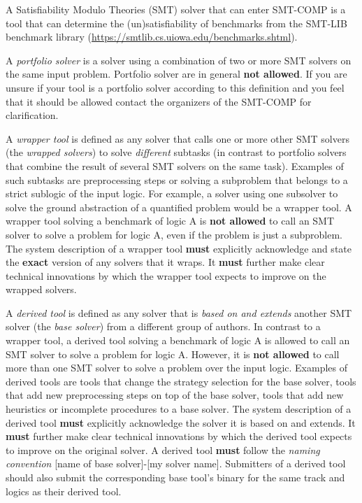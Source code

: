 \documentclass[12pt]{article}
\begin{document}
%
A Satisfiability Modulo Theories (SMT) solver that can enter SMT-COMP is a tool that can determine the
(un)satisfia\-bility of benchmarks from the SMT-LIB benchmark library
(\url{https://smtlib.cs.uiowa.edu/benchmarks.shtml}).

%
A \emph{portfolio solver} is a solver using a combination of two or
more SMT solvers on the same input problem. Portfolio solver are in
general \textbf{not allowed}. If you are unsure if your tool is a portfolio
solver according to this definition and you feel that it should be allowed
contact the organizers of the SMT-COMP for clarification.

%
A \emph{wrapper tool} is defined as any solver that calls one or more other SMT
solvers (the \emph{wrapped solvers}) to solve \emph{different} subtasks
(in contrast to portfolio solvers that combine the result of several SMT
solvers on the same task).
Examples of such subtasks are preprocessing steps or solving a subproblem that
belongs to a strict sublogic of the input logic.
For example, a solver using one subsolver to solve the ground abstraction of a
quantified problem would be a wrapper tool.
A wrapper tool solving a benchmark of logic A
is \textbf{not allowed} to call an SMT solver to solve a problem for logic A,
even if the problem is just a subproblem.
The system description of a wrapper tool \textbf{must}
explicitly acknowledge and state the \textbf{exact} version of any solvers that
it wraps.  It \textbf{must} further make clear technical innovations by which
the wrapper tool expects to improve on the wrapped solvers.

%
A \emph{derived tool} is defined as any solver that is \emph{based on and
extends} another SMT solver (the \emph{base solver}) from a different
group of authors.
In contrast to a wrapper tool, a derived tool solving a benchmark of logic A is allowed to call an SMT solver
to solve a problem for logic A.
However, it is \textbf{not allowed} to call more than one SMT solver to solve a problem over the input logic.
Examples of derived tools are tools that change the strategy selection for the base solver,
tools that add new preprocessing steps on top of the base solver,
tools that add new heuristics or incomplete procedures to a base solver.
The system description of a derived tool
\textbf{must} explicitly acknowledge
the solver it is based on and extends.  It \textbf{must} further make clear
technical innovations by which the derived tool expects to improve on the
original solver.  A derived tool \textbf{must} follow the \emph{naming convention}
{[name of base solver]-[my solver name]}.
Submitters of a derived tool should also submit the corresponding base tool's binary 
for the same track and logics as their derived tool.
\end{document}
